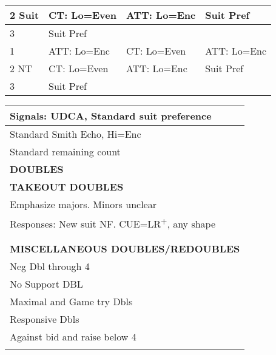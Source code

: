 \documentclass{article}
\newcommand{\he}{\ensuremath\heartsuit}
\newcommand{\di}{\ensuremath\diamondsuit}
\newcommand{\up}{\textsuperscript{+}}
\begin{document}
\begin{minipage}{90mm}
\begin{tabular}{| p{8.9mm} | p{22mm} | p{22mm} | p{22mm} |}
		2 Suit & CT: Lo=Even & ATT: Lo=Enc & Suit Pref \\ \hline
		3 & Suit Pref & & \\ \hline
		1 & ATT: Lo=Enc & CT: Lo=Even & ATT: Lo=Enc \\ \hline
		2 NT & CT: Lo=Even & ATT: Lo=Enc & Suit Pref \\ \hline
		3 & Suit Pref & & \\ \hline
	\end{tabular}
	\begin{tabular}{| p{88mm} |}
		Signals: UDCA, Standard suit preference \\ \hline
		Standard Smith Echo, Hi=Enc \\ \hline
		Standard remaining count \\ \hline
		\cellcolor[gray]{0.9} \textbf{DOUBLES} \\ \hline
		\cellcolor[gray]{0.9} \textbf{TAKEOUT DOUBLES} \\ \hline
		Emphasize majors. Minors unclear \\ \hline
		Responses: New suit NF. CUE=LR\up{}, any shape \\ \hline
		\\ \hline
		\\ \hline
		\cellcolor[gray]{0.9} \textbf{MISCELLANEOUS DOUBLES/REDOUBLES} \\ \hline
		Neg Dbl through 4\di{} \\ \hline
		No Support DBL \\ \hline
		Maximal and Game try Dbls \\ \hline
		Responsive Dbls \\ \hline
		Against bid and raise below 4\he{}: Dbl=Take out\\ \hline
		\\ \hline
	\end{tabular}
\end{minipage}
\begin{minipage}{5mm}
	\begin{tabular}{| p{5mm} |}
	\end{tabular}
\end{minipage}
\end{document}
